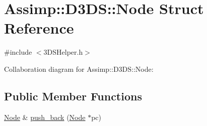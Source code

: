 \hypertarget{struct_assimp_1_1_d3_d_s_1_1_node}{\section{Assimp\+:\+:D3\+D\+S\+:\+:Node Struct Reference}
\label{struct_assimp_1_1_d3_d_s_1_1_node}
}


{\ttfamily \#include $<$3\+D\+S\+Helper.\+h$>$}



Collaboration diagram for Assimp\+:\+:D3\+D\+S\+:\+:Node\+:
\subsection*{Public Member Functions}
\begin{DoxyCompactItemize}
\item 
\hyperlink{struct_assimp_1_1_d3_d_s_1_1_node}{Node} \& \hyperlink{struct_assimp_1_1_d3_d_s_1_1_node_af2898c6e9e4dbd0786a9508b1df360f6}{push\+\_\+back} (\hyperlink{struct_assimp_1_1_d3_d_s_1_1_node}{Node} $\ast$pc)
\end{DoxyCompactItemize}
